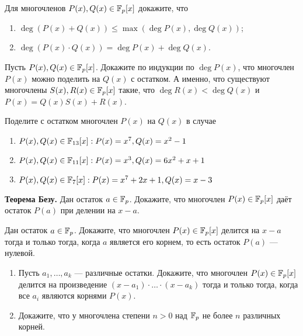 \documentclass{article}
\begin{document}
    \begin{enumerate_boxed}


        \item Для многочленов $P(x), Q(x) \in \mathbb{F}_p[x]$ докажите, что
        \begin{enumerate}
            \item  $\deg(P(x) + Q(x)) \leq \max(\deg P(x), \deg Q(x))$;
            \item  $\deg(P(x) \cdot Q(x)) = \deg P(x) + \deg Q(x)$.
        \end{enumerate}

        \item Пусть $P(x), Q(x) \in \mathbb{F}_p [x]$.
        Докажите по индукции по $\deg P (x)$, что многочлен $P(x)$ можно поделить на $Q(x)$ с остатком.
        А именно, что существуют многочлены $S(x), R(x) \in \mathbb{F}_p[x]$ такие, что $\deg R(x) < \deg Q(x)$ и $P(x) = Q(x)S(x) + R(x)$.

        \item Поделите с остатком многочлен $P(x)$ на $Q(x)$ в случае
        \begin{enumerate}
            \item  $P(x),Q(x) \in \mathbb{F}_{13}[x]: P(x) = x^7, Q(x) = x^2 - 1$
            \item  $P(x),Q(x) \in \mathbb{F}_{11}[x]: P(x) = x^3, Q(x) = 6x^2 + x + 1$
            \item $P(x),Q(x) \in \mathbb{F}_{7}[x]: P(x) = x^7 + 2x + 1, Q(x) = x - 3$
        \end{enumerate}

        \item \textbf{Теорема Безу.} Дан остаток $a \in \mathbb{F}_p$.
        Докажите, что многочлен $P(x) \in \mathbb{F}_p[x]$ даёт остаток $P(a)$ при делении на $x - a$.

        \item Дан остаток $a \in \mathbb{F}_p$.
        Докажите, что многочлен $P(x) \in \mathbb{F}_p[x]$ делится на $x - a$ тогда и только тогда, когда $a$ является его корнем, то есть остаток $P (a)$ — нулевой.

        \item
        \begin{enumerate}
            \item  Пусть $a_1, \ldots, a_k$ — различные остатки.
            Докажите, что многочлен $P (x) \in \mathbb{F}_p[x]$ делится на произведение $(x - a_1) \cdot \ldots \cdot (x - a_k)$ тогда и только тогда, когда все $a_i$ являются корнями $P(x)$.
            \item Докажите, что у многочлена степени $n > 0$ над $\mathbb{F}_p$ не более $n$ различных корней.
        \end{enumerate}


\end{enumerate_boxed}
\end{document}
